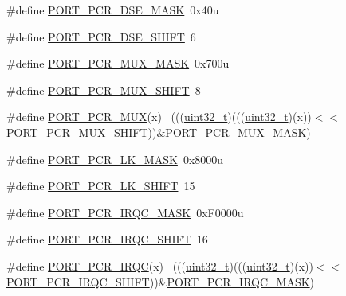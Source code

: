 \begin{DoxyCompactItemize}
\#define \hyperlink{group___p_o_r_t___register___masks_gae1c37b9f66e58bd80e7764232fd05cee}{P\+O\+R\+T\+\_\+\+P\+C\+R\+\_\+\+D\+S\+E\+\_\+\+M\+A\+SK}~0x40u
\item 
\#define \hyperlink{group___p_o_r_t___register___masks_ga00ae08038ade5432d0240666658d8867}{P\+O\+R\+T\+\_\+\+P\+C\+R\+\_\+\+D\+S\+E\+\_\+\+S\+H\+I\+FT}~6
\item 
\#define \hyperlink{group___p_o_r_t___register___masks_ga0feec5fc6b285b83c573f913c74e5c41}{P\+O\+R\+T\+\_\+\+P\+C\+R\+\_\+\+M\+U\+X\+\_\+\+M\+A\+SK}~0x700u
\item 
\#define \hyperlink{group___p_o_r_t___register___masks_gaa39e1cfed4df3797e4f1d141adab8776}{P\+O\+R\+T\+\_\+\+P\+C\+R\+\_\+\+M\+U\+X\+\_\+\+S\+H\+I\+FT}~8
\item 
\#define \hyperlink{group___p_o_r_t___register___masks_gad20ae957ec775096862e8a6542463e03}{P\+O\+R\+T\+\_\+\+P\+C\+R\+\_\+\+M\+UX}(x)                                                ~(((\hyperlink{_p_e___types_8h_a33594304e786b158f3fb30289278f5af}{uint32\+\_\+t})(((\hyperlink{_p_e___types_8h_a33594304e786b158f3fb30289278f5af}{uint32\+\_\+t})(x))$<$$<$\hyperlink{group___p_o_r_t___register___masks_gaa39e1cfed4df3797e4f1d141adab8776}{P\+O\+R\+T\+\_\+\+P\+C\+R\+\_\+\+M\+U\+X\+\_\+\+S\+H\+I\+FT}))\&\hyperlink{group___p_o_r_t___register___masks_ga0feec5fc6b285b83c573f913c74e5c41}{P\+O\+R\+T\+\_\+\+P\+C\+R\+\_\+\+M\+U\+X\+\_\+\+M\+A\+SK})
\item 
\#define \hyperlink{group___p_o_r_t___register___masks_ga671e65e4960f3b103af68881ae99d85a}{P\+O\+R\+T\+\_\+\+P\+C\+R\+\_\+\+L\+K\+\_\+\+M\+A\+SK}~0x8000u
\item 
\#define \hyperlink{group___p_o_r_t___register___masks_ga72ad78bf008f1968310a8abcd09b29ea}{P\+O\+R\+T\+\_\+\+P\+C\+R\+\_\+\+L\+K\+\_\+\+S\+H\+I\+FT}~15
\item 
\#define \hyperlink{group___p_o_r_t___register___masks_gabaef70d886fda0a7da8e862308bf5909}{P\+O\+R\+T\+\_\+\+P\+C\+R\+\_\+\+I\+R\+Q\+C\+\_\+\+M\+A\+SK}~0x\+F0000u
\item 
\#define \hyperlink{group___p_o_r_t___register___masks_ga0bda43cd85ca4d5df17f12a193937d81}{P\+O\+R\+T\+\_\+\+P\+C\+R\+\_\+\+I\+R\+Q\+C\+\_\+\+S\+H\+I\+FT}~16
\item 
\#define \hyperlink{group___p_o_r_t___register___masks_gadbd5b173d13c0766ed34cb90095ba789}{P\+O\+R\+T\+\_\+\+P\+C\+R\+\_\+\+I\+R\+QC}(x)                                              ~(((\hyperlink{_p_e___types_8h_a33594304e786b158f3fb30289278f5af}{uint32\+\_\+t})(((\hyperlink{_p_e___types_8h_a33594304e786b158f3fb30289278f5af}{uint32\+\_\+t})(x))$<$$<$\hyperlink{group___p_o_r_t___register___masks_ga0bda43cd85ca4d5df17f12a193937d81}{P\+O\+R\+T\+\_\+\+P\+C\+R\+\_\+\+I\+R\+Q\+C\+\_\+\+S\+H\+I\+FT}))\&\hyperlink{group___p_o_r_t___register___masks_gabaef70d886fda0a7da8e862308bf5909}{P\+O\+R\+T\+\_\+\+P\+C\+R\+\_\+\+I\+R\+Q\+C\+\_\+\+M\+A\+SK})

\end{DoxyCompactItemize}
